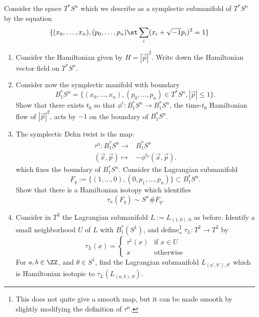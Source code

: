 
 
 
Consider the space $T^*S^n$ which we describe as a symplectic submanifold of $T^*S^n$ by the equation
\[\{(x_0, \ldots, x_n), (p_0, \ldots, p_n) \st \sum_{i} (x_i+\sqrt{-1} p_i)^2=1 \}\]
\begin{enumerate}
    \item Consider the Hamiltonian given by $H=|\vec p|^2$. Write down the Hamiltonian vector field on $T^*S^n$.
    \item Consider now the symplectic manifold with boundary 
    \[B^*_1S^n=\{(x_0, \ldots, x_n), (p_0, \ldots, p_n) \in T^*S^n, |\vec p|\leq 1\}.\]
    Show that there exists $t_0$ so that  $\phi^{t}: B^*_1S^n\to B^*_1 S^n$, the time-$t_0$ Hamiltonian flow of $|\vec p|^2$, acts by  $-1$ on the boundary of $B^*_1S^n$. 
    \item The symplectic Dehn twist is the map: 
    \begin{align*}
        \tau^n: B^*_1 S^n\to& B^*_1 S^n\\
            (\vec x, \vec p) \mapsto& -\phi^{t_0}(\vec x, \vec p).
    \end{align*}
    which fixes the boundary of $B^*_1 S^n$.
    Consider the Lagrangian submanifold  
    \[F_q:=\{(1, \ldots, 0), (0, p_1, \ldots, p_n)\}\subset B^*_1S^n.\]
    Show that there is a Hamiltonian isotopy which identifies
    \[\tau_n(F_q)\sim S^n\# F_q.\]
    \item Consider in $T^2$ the Lagrangian submanifold $L:=L_{(1, 0),0}$ as before. Identify a small neighborhood $U$ of $L$ with $B^*_1(S^1)$, and define\footnote{This does not quite give a smooth map, but it can be made smooth by slightly modifying the definition of $\tau^n$.} $\tau_L: T^2\to T^2$ by 
    \[\tau_L(x)=\left\{\begin{array}{cc} \tau^1(x) &\text{if $x\in U$}\\
        x &\text{otherwise}\end{array}\right.\]
    For $a, b\in \ZZ$, and $\theta\in S^1$, find the Lagrangian submanifold $L_{(a', b'), \theta'}$ which is Hamiltonian isotopic to  $\tau_L(L_{(a, b), \theta})$.
\end{enumerate}

 